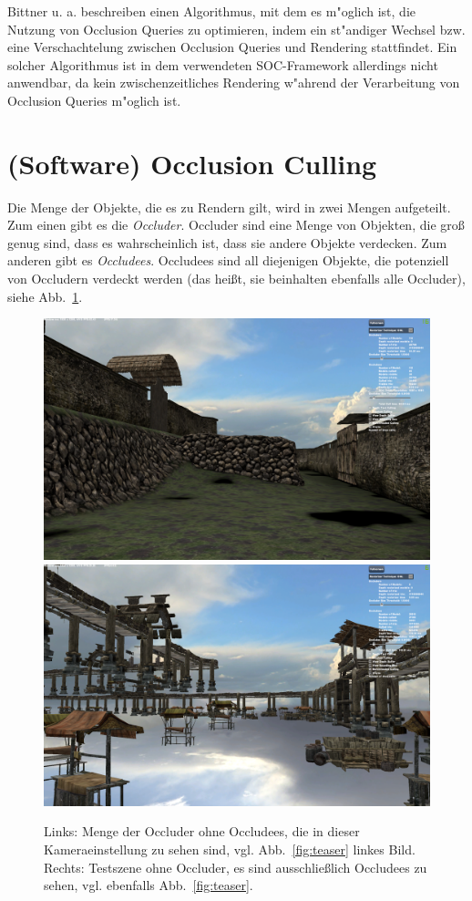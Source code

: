 \documentclass[journal]{vgtc}
\begin{document}
Bittner u. a. \cite{OQMU} beschreiben einen Algorithmus, mit dem es m"oglich ist, die Nutzung von Occlusion Queries zu optimieren, indem ein st"andiger Wechsel bzw. eine Verschachtelung zwischen Occlusion Queries und Rendering stattfindet. Ein solcher Algorithmus ist in dem verwendeten SOC-Framework allerdings nicht anwendbar, da kein zwischenzeitliches Rendering w"ahrend der Verarbeitung von Occlusion Queries m"oglich ist.

\section{(Software) Occlusion Culling}
Die Menge der Objekte, die es zu Rendern gilt, wird in zwei Mengen aufgeteilt.
Zum einen gibt es die \textit{Occluder}.
Occluder sind eine Menge von Objekten, die gro{\ss} genug sind, dass es wahrscheinlich ist, dass sie andere Objekte verdecken.
Zum anderen gibt es \textit{Occludees}.
Occludees sind all diejenigen Objekte, die potenziell von Occludern verdeckt werden (das hei{\ss}t, sie beinhalten ebenfalls alle Occluder), siehe Abb.\ \ref{fig:objects}.
\begin{figure}%
\includegraphics[width=0.5\columnwidth]{images/Occluder.png}%
\includegraphics[width=0.5\columnwidth]{images/Occludees.png}%
\caption{Links: Menge der Occluder ohne Occludees, die in dieser Kameraeinstellung zu sehen sind, vgl. Abb.\ \ref{fig:teaser} linkes Bild. Rechts: Testszene ohne Occluder, es sind ausschlie{\ss}lich Occludees zu sehen, vgl. ebenfalls Abb.\ \ref{fig:teaser}.}%
\label{fig:objects}%
\end{figure}
\end{document}

